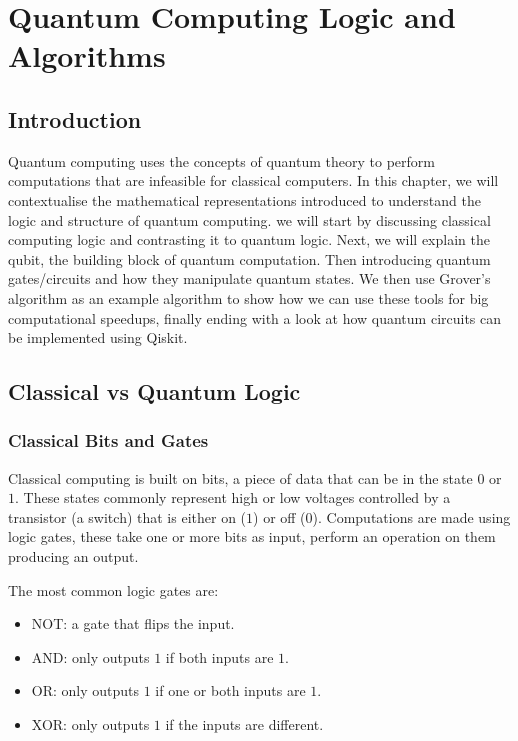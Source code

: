 \chapter{Quantum Computing Logic and Algorithms}

\section{Introduction}

Quantum computing uses the concepts of quantum theory to perform computations that are infeasible for classical computers. In this chapter, we will contextualise the mathematical representations introduced to understand the logic and structure of quantum computing. we will start by discussing classical computing logic and contrasting it to quantum logic. Next, we will explain the qubit, the building block of quantum computation. Then introducing quantum gates/circuits and how they manipulate quantum states. We then use Grover’s algorithm as an example algorithm to show how we can use these tools for big computational speedups, finally ending with a look at how quantum circuits can be implemented using Qiskit.
 



\section{Classical vs Quantum Logic}

\subsection{Classical Bits and Gates}

Classical computing is built on bits, a piece of data that can be in the state $0$ or $1$. These states commonly represent high or low voltages controlled by a transistor (a switch) that is either on ($1$) or off ($0$). Computations are made using logic gates, these take one or more bits as input, perform an operation on them producing an output.

\noindent The most common logic gates are:
\begin{itemize}
    \item NOT: a gate that flips the input.
    \item AND: only outputs $1$ if both inputs are $1$.
    \item OR: only outputs $1$ if one or both inputs are $1$.
    \item XOR: only outputs $1$ if the inputs are different.
\end{itemize}

